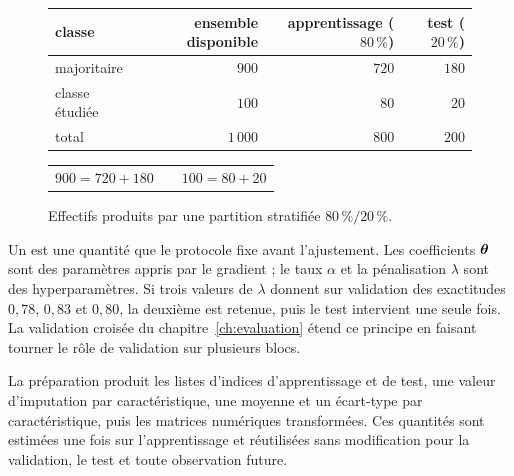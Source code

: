 \begin{figure}[htbp]
\centering
\setlength{\tabcolsep}{12pt}
\renewcommand{\arraystretch}{1.35}
\begin{tabular}{lrrr}
\toprule
classe & ensemble disponible & apprentissage ($80\,\%$) & test ($20\,\%$) \\
\midrule
\textcolor{accent}{majoritaire} & $900$ & $720$ & $180$ \\
\textcolor{warning}{classe étudiée} & $100$ & $80$ & $20$ \\
\midrule
total & $1\,000$ & $800$ & $200$ \\
\bottomrule
\end{tabular}

\vspace{.7em}
\begin{tabular}{ccc}
$900=720+180$ & \qquad & $100=80+20$
\end{tabular}
\caption{Effectifs produits par une partition stratifiée $80\,\%/20\,\%$.}
\label{fig:stratification}
\end{figure}

Un  est une quantité que le protocole fixe avant
l'ajustement. Les coefficients $\boldsymbol{\theta}$ sont des paramètres appris par le gradient ;
le taux $\alpha$ et la pénalisation $\lambda$ sont des hyperparamètres. Si trois
valeurs de $\lambda$ donnent sur validation des exactitudes $0{,}78$, $0{,}83$ et
$0{,}80$, la deuxième est retenue, puis le test intervient une seule fois. La
validation croisée du chapitre~\ref{ch:evaluation} étend ce principe en faisant
tourner le rôle de validation sur plusieurs blocs.

\begin{resultat}
La préparation produit les listes d'indices d'apprentissage et de test, une
valeur d'imputation par caractéristique, une moyenne et un écart-type par
caractéristique, puis les matrices numériques transformées. Ces quantités sont
estimées une fois sur l'apprentissage et réutilisées sans modification pour la
validation, le test et toute observation future.
\end{resultat}

